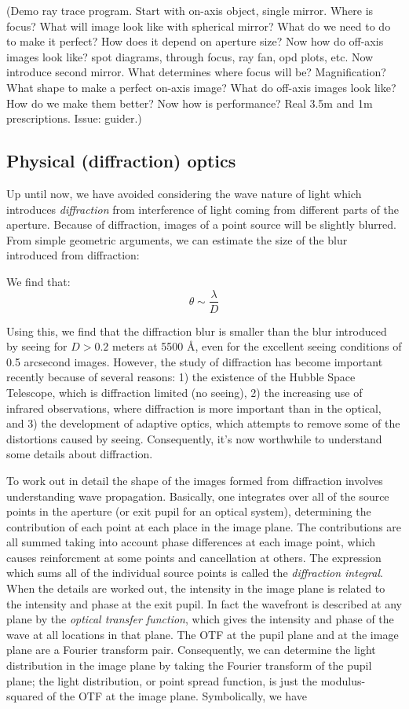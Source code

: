 \documentclass[12pt]{article}
\begin{document}
(Demo ray trace program. Start with on-axis object, single mirror.
Where is focus? What will image look like with spherical mirror? What
do we need to do to make it perfect? How does it depend on aperture
size? Now how do off-axis images look like? spot diagrams, through
focus, ray fan, opd plots, etc. Now introduce second mirror. What
determines where focus will be? Magnification? What shape to make a
perfect on-axis image? What do off-axis images look like? How do we
make them better? Now how is performance? Real 3.5m and 1m
prescriptions. Issue: guider.)

\subsection*{Physical (diffraction) optics}

Up until now, we have avoided considering the wave nature of light
which introduces \emph{diffraction} from interference of light coming from
different parts of the aperture. Because of diffraction, images of a
point source will be slightly blurred. From simple geometric arguments,
we can estimate the size of the blur introduced from diffraction:

We find that:
$$ \theta \sim \frac{\lambda}{D}  $$

Using this, we find that the diffraction blur is smaller than the blur
introduced by seeing for $D > 0.2$ meters at 5500 \AA{}, even for the
excellent seeing conditions of 0.5 arcsecond images. However, the
study of diffraction has become important recently because of several
reasons: 1) the existence of the Hubble Space Telescope, which is
diffraction limited (no seeing), 2) the increasing use of infrared
observations, where diffraction is more important than in the optical,
and 3) the development of adaptive optics, which attempts to remove
some of the distortions caused by seeing. Consequently, it's now
worthwhile to understand some details about diffraction.

To work out in detail the shape of the images formed from diffraction
involves understanding wave propagation. Basically, one integrates
over all of the source points in the aperture (or exit pupil for an
optical system), determining the contribution of each point at each
place in the image plane. The contributions are all summed taking into
account phase differences at each image point, which causes
reinforcment at some points and cancellation at others. The expression
which sums all of the individual source points is called the
\emph{diffraction integral}. When the details are worked out,
the intensity in the image plane is related to the intensity and phase
at the exit pupil. In fact the wavefront is described at any plane by
the \emph{optical transfer function}, which gives the intensity and phase of
the wave at all locations in that plane. The OTF at the pupil plane
and at the image plane are a Fourier transform pair. Consequently, we
can determine the light distribution in the image plane by taking the
Fourier transform of the pupil plane; the light distribution, or point
spread function, is just the modulus-squared of the OTF at the image
plane. Symbolically, we have
\end{document}
